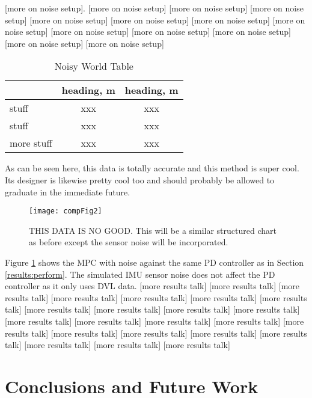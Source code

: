 \documentclass[letterpaper, 10pt, conference]{IEEEtran}
\begin{document}
[more on noise setup]\cite{GP}. [more on noise setup] [more on noise setup] [more on noise setup] [more on noise setup] [more on noise setup] [more on noise setup] [more on noise setup] [more on noise setup] [more on noise setup] [more on noise setup] [more on noise setup] [more on noise setup]

\begin{table}[h]
\caption{Noisy World Table}
\begin{center}
\def\arraystretch{1.1}%
\begin{tabular}{ |l|c|c| } 
 \hline 
  & heading, m & heading, m \\ 
 \hline
 stuff & xxx & xxx \\ 
 stuff & xxx & xxx \\ 
 more stuff & xxx & xxx \\
 \hline
\end{tabular}
\end{center}
\label{table:noiseData}
\end{table}

As can be seen here, this data is totally accurate and this method is super cool. Its designer is likewise pretty cool too and should probably be allowed to graduate in the immediate future.

\begin{figure}
\texttt{[image: compFig2]}
\centering
\caption{THIS DATA IS NO GOOD. This will be a similar structured chart as before except the sensor noise will be incorporated.} 
\label{fig:noiseErrorComp}
\end{figure}

Figure \ref{fig:noiseErrorComp} shows the MPC with noise against the same PD controller as in Section \ref{results:perform}. The simulated IMU sensor noise does not affect the PD controller as it only uses DVL data. [more results talk] [more results talk] [more results talk] [more results talk] [more results talk] [more results talk] [more results talk] [more results talk] [more results talk] [more results talk] [more results talk] [more results talk] [more results talk] [more results talk] [more results talk] [more results talk] [more results talk] [more results talk] [more results talk] [more results talk] [more results talk] [more results talk] [more results talk]

\section{Conclusions and Future Work} 
\label{sec:conclusion}
\end{document}
